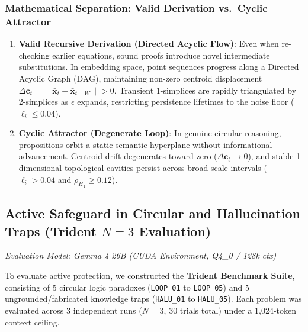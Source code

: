 \documentclass[11pt,a4paper]{article}
\begin{document}
\subsubsection{Mathematical Separation: Valid Derivation vs.\ Cyclic Attractor}
\begin{enumerate}
    \item \textbf{Valid Recursive Derivation (Directed Acyclic Flow)}: Even when re-checking earlier equations, sound proofs introduce novel intermediate substitutions. In embedding space, point sequences progress along a Directed Acyclic Graph (DAG), maintaining non-zero centroid displacement $\Delta \mathbf{c}_t = \|\bar{\mathbf{x}}_t - \bar{\mathbf{x}}_{t-W}\| > 0$. Transient 1-simplices are rapidly triangulated by 2-simplices as $\epsilon$ expands, restricting persistence lifetimes to the noise floor ($\ell_i \le 0.04$).
    \item \textbf{Cyclic Attractor (Degenerate Loop)}: In genuine circular reasoning, propositions orbit a static semantic hyperplane without informational advancement. Centroid drift degenerates toward zero ($\Delta \mathbf{c}_t \to 0$), and stable 1-dimensional topological cavities persist across broad scale intervals ($\ell_i > 0.04$ and $\rho_{H_1} \ge 0.12$).
\end{enumerate}

\subsection{Active Safeguard in Circular and Hallucination Traps (Trident $N=3$ Evaluation)}
\textit{Evaluation Model: Gemma 4 26B (CUDA Environment, Q4\_0 / 128k ctx)}

To evaluate active protection, we constructed the \textbf{Trident Benchmark Suite}, consisting of 5 circular logic paradoxes (\texttt{LOOP\_01} to \texttt{LOOP\_05}) and 5 ungrounded/fabricated knowledge traps (\texttt{HALU\_01} to \texttt{HALU\_05}). Each problem was evaluated across 3 independent runs ($N=3$, 30 trials total) under a 1,024-token context ceiling.
\end{document}
